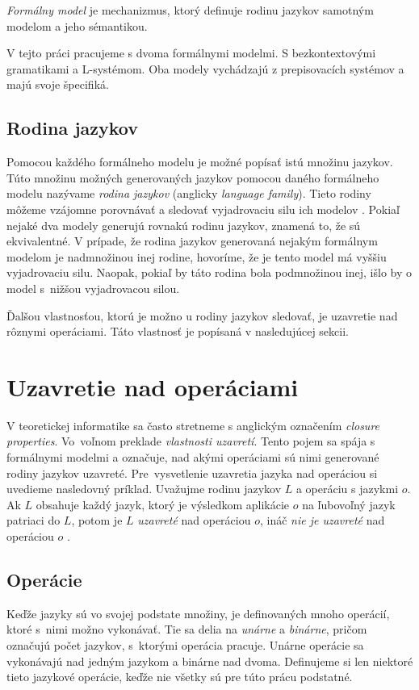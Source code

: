 \begin{definition}
\textit{Formálny model} je mechanizmus, ktorý definuje rodinu jazykov samotným modelom a jeho sémantikou.
\end{definition}

V tejto práci pracujeme s dvoma formálnymi modelmi. S bezkontextovými gramatikami a L-systémom. Oba modely vychádzajú z prepisovacích systémov a majú svoje špecifiká.

\subsection*{Rodina jazykov}
Pomocou každého formálneho modelu je možné popísať istú množinu jazykov. Túto množinu možných generovaných jazykov pomocou daného formálneho modelu nazývame \textit{rodina jazykov} (anglicky \textit{language family}). 
Tieto rodiny môžeme vzájomne porovnávať a sledovať vyjadrovaciu silu ich modelov \cite{medunaBase}. Pokiaľ nejaké dva modely generujú rovnakú rodinu jazykov, znamená to, že sú ekvivalentné. V prípade, že rodina jazykov generovaná nejakým formálnym modelom je nadmnožinou inej rodine, hovoríme, že je tento model má vyššiu vyjadrovaciu silu. Naopak, pokiaľ by táto rodina bola podmnožinou inej, išlo by o model s~nižšou vyjadrovacou silou.

Ďalšou vlastnosťou, ktorú je možno u rodiny jazykov sledovať, je uzavretie nad rôznymi operáciami. Táto vlastnosť je popísaná v nasledujúcej sekcii.


\section{Uzavretie nad operáciami}
\label{closureProperties}
V teoretickej informatike sa často stretneme s anglickým označením \textit{closure properties}. Vo~voľnom preklade \textit{vlastnosti uzavretí}. Tento pojem sa spája s formálnymi modelmi a označuje, nad akými operáciami sú nimi generované rodiny jazykov uzavreté. 
Pre~vysvetlenie uzavretia jazyka nad operáciou si uvedieme nasledovný príklad. Uvažujme rodinu jazykov $L$ a operáciu s jazykmi $o$. Ak $L$ obsahuje každý jazyk, ktorý je výsledkom aplikácie $o$ na ľubovoľný jazyk patriaci do $L$, potom je $L$ \textit{uzavreté} nad operáciou $o$, ináč \textit{nie je uzavreté} nad operáciou $o$ \cite{medunaBase}.

\subsection*{Operácie}
Keďže jazyky sú vo svojej podstate množiny,  je definovaných mnoho operácií, ktoré s~nimi možno vykonávať. Tie sa delia na \textit{unárne} a \textit{binárne}, pričom označujú počet jazykov, s~ktorými operácia pracuje. Unárne operácie sa vykonávajú nad jedným jazykom a binárne nad dvoma. Definujeme si len niektoré tieto jazykové operácie, keďže nie všetky sú pre túto prácu podstatné.

